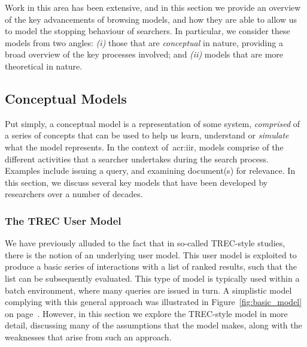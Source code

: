 Work in this area has been extensive, and in this section we provide an overview of the key advancements of browsing models, and how they are able to allow us to model the stopping behaviour of searchers. In particular, we consider these models from two angles: \emph{(i)} those that are \emph{conceptual} in nature, providing a broad overview of the key processes involved; and \emph{(ii)} models that are more theoretical in nature.

%
%
%

\subsection{Conceptual Models}\label{sec:stopping_background:models:conceptual}
Put simply, a conceptual model is a representation of some system, \emph{comprised} of a series of concepts that can be used to help us learn, understand or \emph{simulate} what the model represents. In the context of~\gls{acr:iir}, models comprise of the different activities that a searcher undertakes during the search process. Examples include issuing a query, and examining document(s) for relevance. In this section, we discuss several key models that have been developed by researchers over a number of decades.

\subsubsection{The TREC User Model}\label{sec:stopping_background:models:conceptual:trec}
We have previously alluded to the fact that in so-called TREC-style studies, there is the notion of an underlying user model. This user model is exploited to produce a basic series of interactions with a list of ranked results, such that the list can be subsequently evaluated. This type of model is typically used within a batch environment, where many queries are issued in turn. A simplistic model complying with this general approach was illustrated in Figure~\ref{fig:basic_model} on page~\pageref{fig:basic_model}. However, in this section we explore the TREC-style model in more detail, discussing many of the assumptions that the model makes, along with the weaknesses that arise from such an approach.

